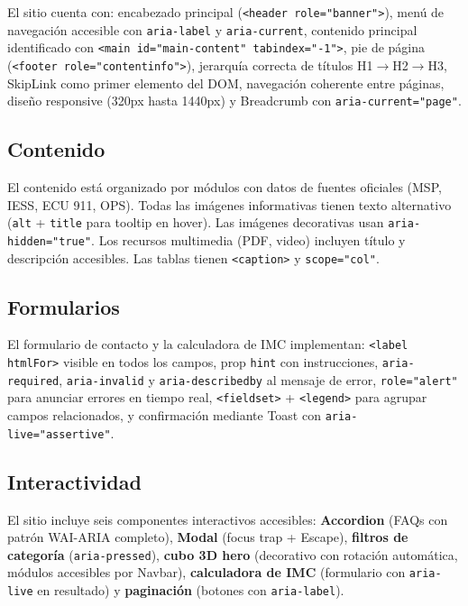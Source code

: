 \documentclass[12pt, a4paper]{article}
\begin{document}
El sitio cuenta con: encabezado principal (\texttt{<header role="banner">}), menú de navegación accesible con \texttt{aria-label} y \texttt{aria-current}, contenido principal identificado con \texttt{<main id="main-content" tabindex="-1">}, pie de página (\texttt{<footer role="contentinfo">}), jerarquía correcta de títulos H1$\to$H2$\to$H3, SkipLink como primer elemento del DOM, navegación coherente entre páginas, diseño responsive (320px hasta 1440px) y Breadcrumb con \texttt{aria-current="page"}.

\subsection{Contenido}

El contenido está organizado por módulos con datos de fuentes oficiales (MSP, IESS, ECU 911, OPS). Todas las imágenes informativas tienen texto alternativo (\texttt{alt} + \texttt{title} para tooltip en hover). Las imágenes decorativas usan \texttt{aria-hidden="true"}. Los recursos multimedia (PDF, video) incluyen título y descripción accesibles. Las tablas tienen \texttt{<caption>} y \texttt{scope="col"}.

\subsection{Formularios}

El formulario de contacto y la calculadora de IMC implementan: \texttt{<label htmlFor>} visible en todos los campos, prop \texttt{hint} con instrucciones, \texttt{aria-required}, \texttt{aria-invalid} y \texttt{aria-describedby} al mensaje de error, \texttt{role="alert"} para anunciar errores en tiempo real, \texttt{<fieldset>} + \texttt{<legend>} para agrupar campos relacionados, y confirmación mediante Toast con \texttt{aria-live="assertive"}.

\subsection{Interactividad}

El sitio incluye seis componentes interactivos accesibles: \textbf{Accordion} (FAQs con patrón WAI-ARIA completo), \textbf{Modal} (focus trap + Escape), \textbf{filtros de categoría} (\texttt{aria-pressed}), \textbf{cubo 3D hero} (decorativo con rotación automática, módulos accesibles por Navbar), \textbf{calculadora de IMC} (formulario con \texttt{aria-live} en resultado) y \textbf{paginación} (botones con \texttt{aria-label}).
\end{document}
